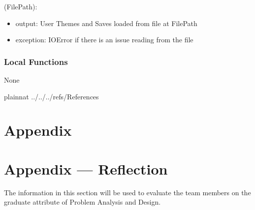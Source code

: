 \documentclass[12pt, titlepage]{article}
\begin{document}
(FilePath):
\begin{itemize}
\item output: User Themes and Saves loaded from file at FilePath
\item exception: IOError if there is an issue reading from the file
\end{itemize}


%

\subsubsection{Local Functions}

None
\newpage


 {plainnat}
 {../../../refs/References}

\newpage

\section{Appendix} \label{Appendix}


\newpage{}

\section*{Appendix --- Reflection}

The information in this section will be used to evaluate the team members on the
graduate attribute of Problem Analysis and Design.


\end{document}
